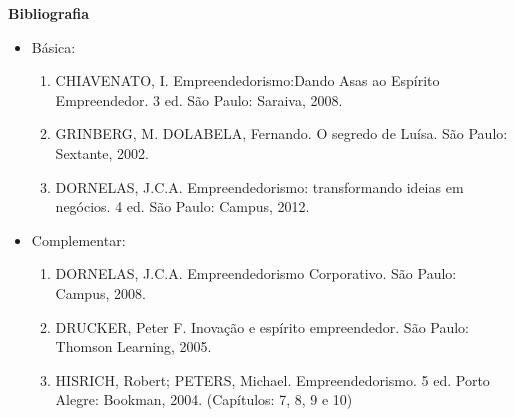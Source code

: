 


\begin{snugshade}\begin{center}\textbf{
    Bibliografia
}\end{center}\end{snugshade}

\begin{itemize} 

\item Básica:

    \begin{enumerate}

    \item CHIAVENATO, I. Empreendedorismo:Dando Asas ao Espírito 		Empreendedor. 3 ed. São Paulo: Saraiva, 2008.

    \item GRINBERG, M.
		DOLABELA, Fernando. O segredo de Luísa. São Paulo: Sextante, 2002.
    
    \item DORNELAS, J.C.A. Empreendedorismo: transformando ideias em 		negócios. 4 ed. São Paulo: Campus, 2012.

    \end{enumerate}

\item Complementar:
	\begin{enumerate} 

    \item DORNELAS, J.C.A. Empreendedorismo Corporativo. São Paulo: Campus, 		2008.

    \item DRUCKER, Peter F. Inovação e espírito empreendedor. São Paulo: 		Thomson Learning, 2005.

    \item HISRICH, Robert; PETERS, Michael. Empreendedorismo. 5 ed. Porto 		Alegre: Bookman, 2004. (Capítulos: 7, 8, 9 e 10)
	\end{enumerate}

\end{itemize}




